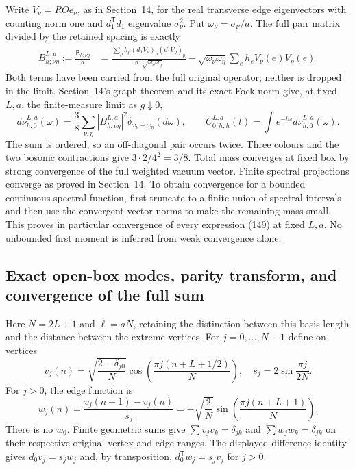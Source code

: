 \documentclass[11pt]{article}
\begin{document}
Write $V_\nu=RO e_\nu$, as in Section~14, for the real transverse
edge eigenvectors with counting norm one and $d_1^{\mathsf T}d_1$
eigenvalue $\sigma_\nu^2$. Put $\omega_\nu=\sigma_\nu/a$. The full pair
matrix divided by the retained spacing is exactly
\begin{align}
 B_{h;\nu\eta}^{L,a}:=\frac{\mathsf R_{h;\nu\eta}}{a}
 &= \frac{\sum_p h_p(d_1V_\nu)_p(d_1V_\eta)_p}
                  {a^2\sqrt{\omega_\nu\omega_\eta}}
       -\sqrt{\omega_\nu\omega_\eta}\sum_e h_e V_\nu(e)V_\eta(e).
 \label{eq:full-pair-native}
\end{align}
Both terms have been carried from the full original operator; neither
is dropped in the limit. Section~14's graph theorem and its exact Fock
norm give, at fixed $L,a$, the finite-measure limit as $g\downarrow0$,
\begin{equation}\label{eq:full-finite-measure}
 d\nu_{h,0}^{L,a}(\omega)
 =\frac38\sum_{\nu,\eta}|B_{h;\nu\eta}^{L,a}|^2
                 \delta_{\omega_\nu+\omega_\eta}(d\omega),
 \qquad C_{0;h,h}^{L,a}(t)=\int e^{-t\omega}d\nu_{h,0}^{L,a}(\omega).
\end{equation}
The sum is ordered, so an off-diagonal pair occurs twice. Three colours
and the two bosonic contractions give $3\cdot2/4^2=3/8$.
Total mass converges at fixed box by strong convergence of the full
weighted vacuum vector. Finite spectral projections converge as proved
in Section~14. To obtain convergence for a bounded continuous spectral
function, first truncate to a finite union of spectral intervals and
then use the convergent vector norms to make the remaining mass small.
This proves in particular convergence of every expression
(149) at fixed $L,a$. No unbounded first moment is
inferred from weak convergence alone.

\subsection{Exact open-box modes, parity transform, and convergence of the full sum}

Here $N=2L+1$ and $\ell=aN$, retaining the distinction between this
basis length and the distance between the extreme vertices. For
$j=0,\ldots,N-1$ define on vertices
\[
 v_j(n)=\sqrt{\frac{2-\delta_{j0}}N}
       \cos\!\left(\frac{\pi j(n+L+1/2)}N\right),
 \quad s_j=2\sin\frac{\pi j}{2N}.
\]
For $j>0$, the edge function is
\[
 w_j(n)=\frac{v_j(n+1)-v_j(n)}{s_j}
       =-\sqrt{\frac2N}\sin\!\left(\frac{\pi j(n+L+1)}N\right).
\]
There is no $w_0$. Finite geometric sums give
$\sum v_jv_k=\delta_{jk}$ and $\sum w_jw_k=\delta_{jk}$ on their
respective original vertex and edge ranges. The displayed difference
identity gives $d_0v_j=s_jw_j$ and, by transposition,
$d_0^{\mathsf T}w_j=s_jv_j$ for $j>0$.
\end{document}
